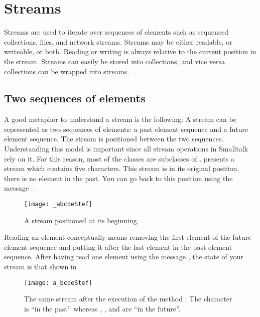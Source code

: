 \documentclass[a4paper,10pt,twoside]{book}
\begin{document}
	\renewcommand{\nnbb}[2]{} %
	\sloppy
\fi
\chapter{Streams}\label{cha:streams}

Streams are used to iterate over sequences of elements such as sequenced collections, files, and network streams.
Streams may be either readable, or writeable, or both.
Reading or writing is always relative to the current position in the stream.
Streams can easily be stored into collections, and vice versa collections can be wrapped into streams.

\section{Two sequences of elements}
A good metaphor to understand a stream is the following:
A stream can be represented as two sequences of elements: a past element sequence and a future element sequence.
The stream is positioned between the two sequences.
Understanding this model is important since all stream operations in Smalltalk rely on it.
For this reason, most of the  classes are subclasses of .
 presents a stream which contains five characters. This stream is in its original position, \ie there is no element in the past.
You can go back to this position using the message .

\begin{figure}[ht]
\centerline{\texttt{[image: \_abcdeStef]}}
\caption{A stream positioned at its beginning.}
\label{fig:_abcde}
\vspace{.2in}
\end{figure}

Reading an element conceptually means removing the first element of the future element sequence and putting it after the last element in the past element sequence.
After having read one element using the message , the state of your stream is that shown in .

\begin{figure}[ht]
\centerline{\texttt{[image: a\_bcdeStef]}}
\caption{The same stream after the execution of the method :
The character  is ``in the past'' whereas , ,  and  are ``in the future''.}
\label{fig:a_bcde}
\vspace{.2in}
\end{figure}
\end{document}
